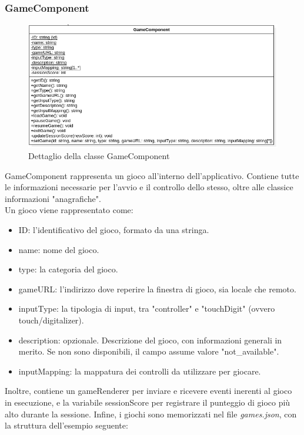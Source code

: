 \subsubsection{GameComponent}
\begin{figure}[h]
    \centering
    \includegraphics[width=340pt]{images/prog/Game.png}
    \caption{Dettaglio della classe GameComponent}
    \label{fig:gameComponent}
\end{figure}
GameComponent rappresenta un gioco all'interno dell'applicativo. Contiene tutte le informazioni necessarie per l'avvio e il controllo dello stesso, oltre alle classice informazioni "anagrafiche".\\
Un gioco viene rappresentato come:
\begin{itemize}
    \item ID: l'identificativo del gioco, formato da una stringa.
    \item name: nome del gioco.
    \item type: la categoria del gioco.
    \item gameURL: l'indirizzo dove reperire la finestra di gioco, sia locale che remoto.
    \item inputType: la tipologia di input, tra "controller" e "touchDigit" (ovvero touch/digitalizer).
    \item description: opzionale. Descrizione del gioco, con informazioni generali in merito. Se non sono disponibili, il campo assume valore "not_available".
    \item inputMapping: la mappatura dei controlli da utilizzare per giocare.
\end{itemize}
Inoltre, contiene un gameRenderer per inviare e ricevere eventi inerenti al gioco in esecuzione, e la variabile sessionScore per registrare il punteggio di gioco più alto durante la sessione.
Infine, i giochi sono memorizzati nel file \emph{games.json}, con la struttura dell'esempio seguente:
